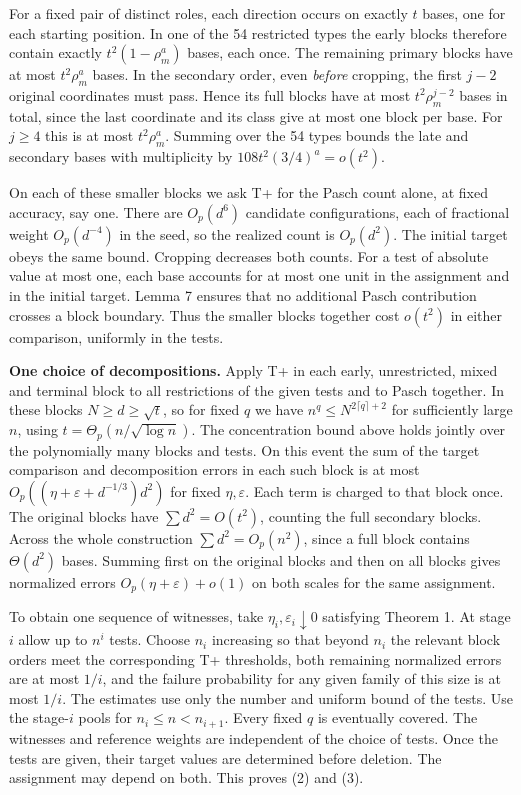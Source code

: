 \documentclass[english,11pt,a4paper]{article}
\begin{document}
For a fixed pair of distinct roles, each direction occurs on exactly \(t\) bases, one for each starting position. In one of the 54 restricted types the early blocks therefore contain exactly \(t^2(1-\rho_m^a)\) bases, each once. The remaining primary blocks have at most \(t^2\rho_m^a\) bases. In the secondary order, even \emph{before} cropping, the first \(j-2\) original coordinates must pass. Hence its full blocks have at most \(t^2\rho_m^{j-2}\) bases in total, since the last coordinate and its class give at most one block per base. For \(j\ge4\) this is at most \(t^2\rho_m^a\). Summing over the 54 types bounds the late and secondary bases with multiplicity by \(108t^2(3/4)^a=o(t^2)\).

On each of these smaller blocks we ask T+ for the Pasch count alone, at fixed accuracy, say one. There are \(O_p(d^6)\) candidate configurations, each of fractional weight \(O_p(d^{-4})\) in the seed, so the realized count is \(O_p(d^2)\). The initial target obeys the same bound. Cropping decreases both counts. For a test of absolute value at most one, each base accounts for at most one unit in the assignment and in the initial target. Lemma 7 ensures that no additional Pasch contribution crosses a block boundary. Thus the smaller blocks together cost \(o(t^2)\) in either comparison, uniformly in the tests.

\textbf{One choice of decompositions.} Apply T+ in each early, unrestricted, mixed and terminal block to all restrictions of the given tests and to Pasch together. In these blocks \(N\ge d\ge\sqrt t\), so for fixed \(q\) we have \(n^q\le N^{2\lceil q\rceil+2}\) for sufficiently large \(n\), using \(t=\Theta_p(n/\sqrt{\log n})\). The concentration bound above holds jointly over the polynomially many blocks and tests. On this event the sum of the target comparison and decomposition errors in each such block is at most \(O_p((\eta+\varepsilon+d^{-1/3})d^2)\) for fixed \(\eta,\varepsilon\). Each term is charged to that block once. The original blocks have \(\sum d^2=O(t^2)\), counting the full secondary blocks. Across the whole construction \(\sum d^2=O_p(n^2)\), since a full block contains \(\Theta(d^2)\) bases. Summing first on the original blocks and then on all blocks gives normalized errors \(O_p(\eta+\varepsilon)+o(1)\) on both scales for the same assignment.

To obtain one sequence of witnesses, take \(\eta_i,\varepsilon_i\downarrow0\) satisfying Theorem 1. At stage \(i\) allow up to \(n^i\) tests. Choose \(n_i\) increasing so that beyond \(n_i\) the relevant block orders meet the corresponding T+ thresholds, both remaining normalized errors are at most \(1/i\), and the failure probability for any given family of this size is at most \(1/i\). The estimates use only the number and uniform bound of the tests. Use the stage-\(i\) pools for \(n_i\le n<n_{i+1}\). Every fixed \(q\) is eventually covered. The witnesses and reference weights are independent of the choice of tests. Once the tests are given, their target values are determined before deletion. The assignment may depend on both. This proves (2) and (3).
\end{document}
